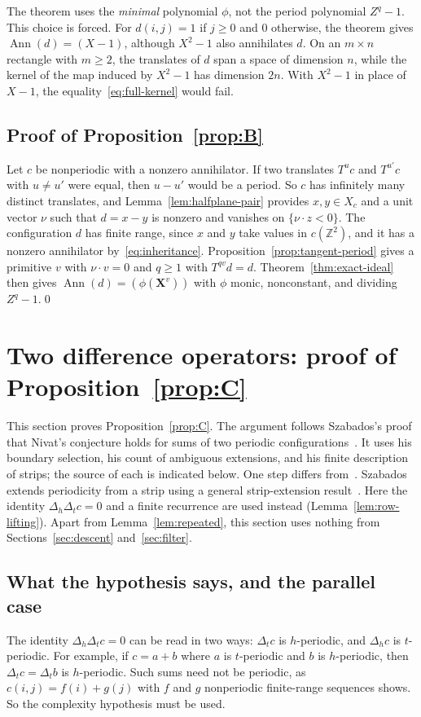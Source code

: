 \documentclass[11pt,a4paper,reqno]{amsart}
\theoremstyle{definition}
\theoremstyle{remark}
\newcommand{\Z}{\mathbb Z}
\newcommand{\mon}[1]{\boldsymbol X^{#1}}
\newcommand{\De}{\Delta}
\DeclareMathOperator{\Ann}{Ann}
\numberwithin{equation}{section}
\begin{document}
The theorem uses the \emph{minimal} polynomial $\phi$, not the period polynomial $Z^q-1$. This choice is forced. For $d(i,j)=1$ if $j\ge0$ and $0$ otherwise, the theorem gives $\Ann(d)=(X-1)$, although $X^2-1$ also annihilates $d$. On an $m\times n$ rectangle with $m\ge2$, the translates of $d$ span a space of dimension $n$, while the kernel of the map induced by $X^2-1$ has dimension $2n$. With $X^2-1$ in place of $X-1$, the equality~\eqref{eq:full-kernel} would fail.

\subsection{Proof of Proposition~\ref{prop:B}}
Let $c$ be nonperiodic with a nonzero annihilator. If two translates $T^uc$ and $T^{u'}c$ with $u\ne u'$ were equal, then $u-u'$ would be a period. So $c$ has infinitely many distinct translates, and Lemma~\ref{lem:halfplane-pair} provides $x,y\in X_c$ and a unit vector $\nu$ such that $d=x-y$ is nonzero and vanishes on $\{\nu\cdot z<0\}$. The configuration $d$ has finite range, since $x$ and $y$ take values in $c(\Z^2)$, and it has a nonzero annihilator by~\eqref{eq:inheritance}. Proposition~\ref{prop:tangent-period} gives a primitive $v$ with $\nu\cdot v=0$ and $q\ge1$ with $T^{qv}d=d$. Theorem~\ref{thm:exact-ideal} then gives $\Ann(d)=(\phi(\mon v))$ with $\phi$ monic, nonconstant, and dividing $Z^q-1$.\qed

\section{Two difference operators: proof of Proposition~\ref{prop:C}}\label{sec:twofactor}

This section proves Proposition~\ref{prop:C}. The argument follows Szabados's proof that Nivat's conjecture holds for sums of two periodic configurations~\cite{Sz}. It uses his boundary selection, his count of ambiguous extensions, and his finite description of strips; the source of each is indicated below. One step differs from~\cite{Sz}. Szabados extends periodicity from a strip using a general strip-extension result~\cite[Lemma~3 and Appendix~A.2]{Sz}. Here the identity $\De_h\De_tc=0$ and a finite recurrence are used instead (Lemma~\ref{lem:row-lifting}). Apart from Lemma~\ref{lem:repeated}, this section uses nothing from Sections~\ref{sec:descent} and~\ref{sec:filter}.

\subsection{What the hypothesis says, and the parallel case}
The identity $\De_h\De_tc=0$ can be read in two ways: $\De_tc$ is $h$-periodic, and $\De_hc$ is $t$-periodic. For example, if $c=a+b$ where $a$ is $t$-periodic and $b$ is $h$-periodic, then $\De_tc=\De_tb$ is $h$-periodic. Such sums need not be periodic, as $c(i,j)=f(i)+g(j)$ with $f$ and $g$ nonperiodic finite-range sequences shows. So the complexity hypothesis must be used.
\end{document}
